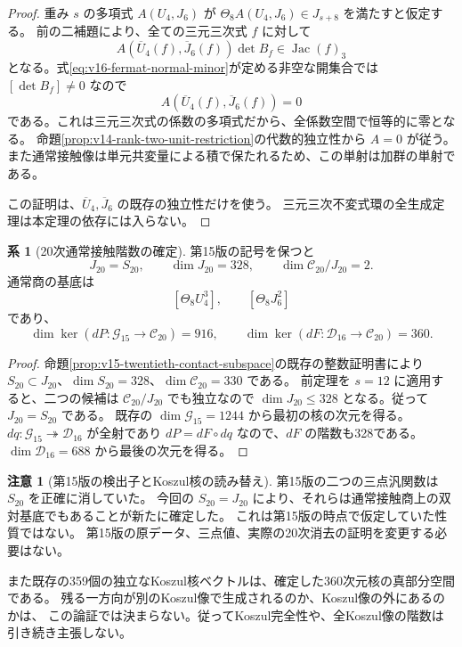 \documentclass[a4paper,11pt]{ltjsarticle}
\theoremstyle{definition}
\newtheorem{remark}[theorem]{注意}
\newtheorem{corollary}[theorem]{系}
\begin{document}
\begin{proof}
重み $s$ の多項式 $A(U_4,J_6)$ が
$\Theta_8 A(U_4,J_6)\in J_{s+8}$ を満たすと仮定する。
前の二補題により、全ての三元三次式 $f$ に対して
\[
 A(\overline U_4(f),\overline J_6(f))\det B_f
      \in\operatorname{Jac}(f)_3
\]
となる。式\eqref{eq:v16-fermat-normal-minor}が定める非空な開集合では
$[\det B_f]\ne0$ なので
\[
 A(\overline U_4(f),\overline J_6(f))=0
\]
である。これは三元三次式の係数の多項式だから、全係数空間で恒等的に零となる。
命題\ref{prop:v14-rank-two-unit-restriction}の代数的独立性から $A=0$ が従う。
また通常接触像は単元共変量による積で保たれるため、この単射は加群の単射である。

この証明は、$\overline U_4,\overline J_6$ の既存の独立性だけを使う。
三元三次不変式環の全生成定理\cite{Fisher2008}は本定理の依存には入らない。
\end{proof}

\begin{corollary}[20次通常接触階数の確定]
\label{cor:v16-exact-twentieth-contact-rank}
第15版の記号を保つと
\begin{equation}\label{eq:v16-exact-twentieth-rank}
 J_{20}=S_{20},\qquad\dim J_{20}=328,
 \qquad\dim\mathcal C_{20}/J_{20}=2.
\end{equation}
通常商の基底は
\[
 [\Theta_8U_4^3],\qquad[\Theta_8J_6^2]
\]
であり、
\[
 \dim\ker(dP:\mathcal G_{15}\to\mathcal C_{20})=916,
 \qquad
 \dim\ker(dF:\mathcal D_{16}\to\mathcal C_{20})=360.
\]
\end{corollary}

\begin{proof}
命題\ref{prop:v15-twentieth-contact-subspace}の既存の整数証明書により
$S_{20}\subset J_{20}$、$\dim S_{20}=328$、$\dim\mathcal C_{20}=330$ である。
前定理を $s=12$ に適用すると、二つの候補は $\mathcal C_{20}/J_{20}$ でも独立なので
$\dim J_{20}\le328$ となる。従って $J_{20}=S_{20}$ である。
既存の $\dim\mathcal G_{15}=1244$ から最初の核の次元を得る。
$dq:\mathcal G_{15}\twoheadrightarrow\mathcal D_{16}$ が全射であり
$dP=dF\circ dq$ なので、$dF$ の階数も328である。
$\dim\mathcal D_{16}=688$ から最後の次元を得る。
\end{proof}

\begin{remark}[第15版の検出子とKoszul核の読み替え]
第15版の二つの三点汎関数は $S_{20}$ を正確に消していた。
今回の $S_{20}=J_{20}$ により、それらは通常接触商上の双対基底でもあることが新たに確定した。
これは第15版の時点で仮定していた性質ではない。
第15版の原データ、三点値、実際の20次消去の証明を変更する必要はない。

また既存の359個の独立なKoszul核ベクトルは、確定した360次元核の真部分空間である。
残る一方向が別のKoszul像で生成されるのか、Koszul像の外にあるのかは、
この論証では決まらない。従ってKoszul完全性や、全Koszul像の階数は引き続き主張しない。
\end{remark}
\end{document}
